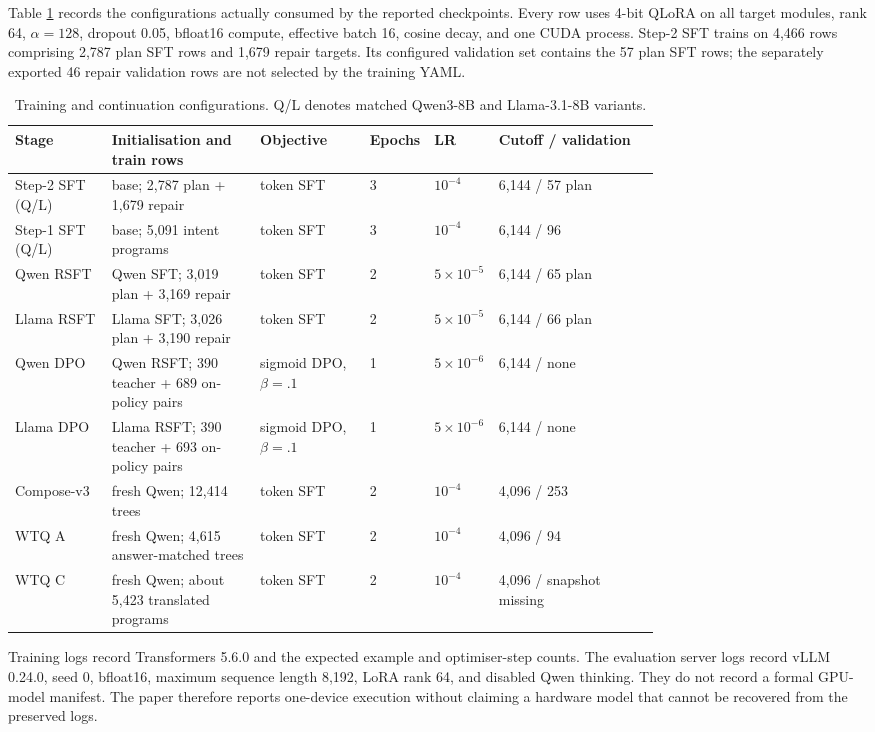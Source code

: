 Table \ref{tab:training-config} records the configurations actually consumed by the reported
checkpoints.  Every row uses 4-bit QLoRA on all target modules, rank 64, $\alpha=128$, dropout
0.05, bfloat16 compute, effective batch 16, cosine decay, and one CUDA process.  Step-2 SFT trains
on 4,466 rows comprising 2,787 plan SFT rows and 1,679 repair targets.  Its configured validation set contains the
57 plan SFT rows; the separately exported 46 repair validation rows are not selected by the
training YAML.

\begin{table}[h]
  \centering
  \caption{Training and continuation configurations.  Q/L denotes matched Qwen3-8B and
  Llama-3.1-8B variants.}
  \label{tab:training-config}
  \small
  \begin{tabularx}{\linewidth}{p{0.15\linewidth}p{0.23\linewidth}p{0.17\linewidth}p{0.10\linewidth}p{0.10\linewidth}X}
    \toprule
    Stage & Initialisation and train rows & Objective & Epochs & LR & Cutoff / validation \\
    \midrule
    Step-2 SFT (Q/L) & base; 2,787 plan + 1,679 repair & token SFT & 3 & $10^{-4}$ & 6,144 / 57 plan \\
    Step-1 SFT (Q/L) & base; 5,091 intent programs & token SFT & 3 & $10^{-4}$ & 6,144 / 96 \\
    Qwen RSFT & Qwen SFT; 3,019 plan + 3,169 repair & token SFT & 2 & $5\times10^{-5}$ & 6,144 / 65 plan \\
    Llama RSFT & Llama SFT; 3,026 plan + 3,190 repair & token SFT & 2 & $5\times10^{-5}$ & 6,144 / 66 plan \\
    Qwen DPO & Qwen RSFT; 390 teacher + 689 on-policy pairs & sigmoid DPO, $\beta=.1$ & 1 & $5\times10^{-6}$ & 6,144 / none \\
    Llama DPO & Llama RSFT; 390 teacher + 693 on-policy pairs & sigmoid DPO, $\beta=.1$ & 1 & $5\times10^{-6}$ & 6,144 / none \\
    Compose-v3 & fresh Qwen; 12,414 trees & token SFT & 2 & $10^{-4}$ & 4,096 / 253 \\
    WTQ A & fresh Qwen; 4,615 answer-matched trees & token SFT & 2 & $10^{-4}$ & 4,096 / 94 \\
    WTQ C & fresh Qwen; about 5,423 translated programs & token SFT & 2 & $10^{-4}$ & 4,096 / snapshot missing \\
    \bottomrule
  \end{tabularx}
\end{table}

Training logs record Transformers 5.6.0 and the expected example and optimiser-step counts.  The
evaluation server logs record vLLM 0.24.0, seed 0, bfloat16, maximum sequence length 8,192, LoRA
rank 64, and disabled Qwen thinking.  They do not record a formal GPU-model manifest.  The paper
therefore reports one-device execution without claiming a hardware model that cannot be recovered
from the preserved logs.

